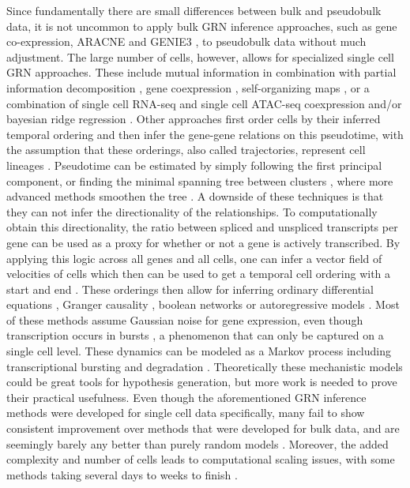Since fundamentally there are small differences between bulk and pseudobulk data, it is not uncommon to apply bulk GRN inference approaches, such as gene co-expression, ARACNE \cite{Margolin_2006} and GENIE3 \cite{Huynh_Thu_2010}, to pseudobulk data without much adjustment. The large number of cells, however, allows for specialized single cell GRN approaches. These include mutual information in combination with partial information decomposition \cite{Chan_2017}, gene coexpression \cite{Aibar_2017}, self-organizing maps \cite{Jansen_2019}, or a combination of single cell RNA-seq and single cell ATAC-seq coexpression and/or bayesian ridge regression \cite{Gonz_lez_Blas_2022,Jiang_2021,Kamimoto_2020}. Other approaches first order cells by their inferred temporal ordering and then infer the gene-gene relations on this pseudotime, with the assumption that these orderings, also called trajectories, represent cell lineages \cite{Packer_2019}. Pseudotime can be estimated by simply following the first principal component, or finding the minimal spanning tree between clusters \cite{Wolf_2019}, where more advanced methods smoothen the tree \cite{Qiu_2017,Street_2018}. A downside of these techniques is that they can not infer the directionality of the relationships. To computationally obtain this directionality, the ratio between spliced and unspliced transcripts per gene can be used as a proxy for whether or not a gene is actively transcribed. By applying this logic across all genes and all cells, one can infer a vector field of velocities of cells which then can be used to get a temporal cell ordering with a start and end \cite{Bergen_2020,La_Manno_2018}. These orderings then allow for inferring ordinary differential equations \cite{Aubin_Frankowski_2020,Matsumoto_2017}, Granger causality \cite{Deshpande_2022,Papili_Gao_2017,Qiu_2020}, boolean networks \cite{Woodhouse_2018} or autoregressive models \cite{Sanchez_Castillo_2017}. Most of these methods assume Gaussian noise for gene expression, even though transcription occurs in bursts \cite{Chubb_2006,Larsson_2019}, a phenomenon that can only be captured on a single cell level. These dynamics can be modeled as a Markov process including transcriptional bursting and degradation \cite{Ventre_2022}. Theoretically these mechanistic models could be great tools for hypothesis generation, but more work is needed to prove their practical usefulness. Even though the aforementioned GRN inference methods were developed for single cell data specifically, many fail to show consistent improvement over methods that were developed for bulk data, and are seemingly barely any better than purely random models \cite{McCalla_2021,Chen_2018,Pratapa_2020}. Moreover, the added complexity and number of cells leads to computational scaling issues, with some methods taking several days to weeks to finish \cite{McCalla_2021}.

